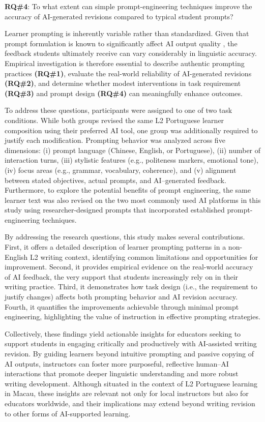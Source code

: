 \documentclass[english]{textolivre}
\begin{document}
    \textbf{RQ\#4}: To what extent can simple prompt-engineering techniques improve the accuracy of AI-generated revisions compared to typical student prompts?


Learner prompting is inherently variable rather than standardized. Given that prompt formulation is known to significantly affect AI output quality \cite{sahoo2025,2024schulho}, the feedback students ultimately receive can vary considerably in linguistic accuracy. Empirical investigation is therefore essential to describe authentic prompting practices \textbf{(RQ\#1)}, evaluate the real-world reliability of AI-generated revisions \textbf{(RQ\#2)}, and determine whether modest interventions in task requirement \textbf{(RQ\#3)} and prompt design \textbf{(RQ\#4)} can meaningfully enhance outcomes.

To address these questions, participants were assigned to one of two task conditions. While both groups revised the same L2 Portuguese learner composition using their preferred AI tool, one group was additionally required to justify each modification. Prompting behavior was analyzed across five dimensions: (i) prompt language (Chinese, English, or Portuguese), (ii) number of interaction turns, (iii) stylistic features (e.g., politeness markers, emotional tone), (iv) focus areas (e.g., grammar, vocabulary, coherence), and (v) alignment between stated objectives, actual prompts, and AI--generated feedback. Furthermore, to explore the potential benefits of prompt engineering, the same learner text was also revised on the two most commonly used AI platforms in this study using researcher-designed prompts that incorporated established prompt-engineering techniques. 
 

By addressing the research questions, this study makes several contributions. First, it offers a detailed description of learner prompting patterns in a non-English L2 writing context, identifying common limitations and opportunities for improvement. Second, it provides empirical evidence on the real-world accuracy of AI feedback, the very support that students increasingly rely on in their writing practice. Third, it demonstrates how task design (i.e., the requirement to justify changes) affects both prompting behavior and AI revision accuracy. Fourth, it quantifies the improvements achievable through minimal prompt engineering, highlighting the value of instruction in effective prompting strategies. 

Collectively, these findings yield actionable insights for educators seeking to support students in engaging critically and productively with AI-assisted writing revision.
By guiding learners beyond intuitive prompting and passive copying of AI outputs, instructors can foster more purposeful, reflective human–AI interactions that promote deeper linguistic understanding and more robust writing development. 
Although situated in the context of L2 Portuguese learning in Macau, these insights are relevant not only for local instructors but also for educators worldwide, and their implications may extend beyond writing revision to other forms of AI-supported learning.
\end{document}
